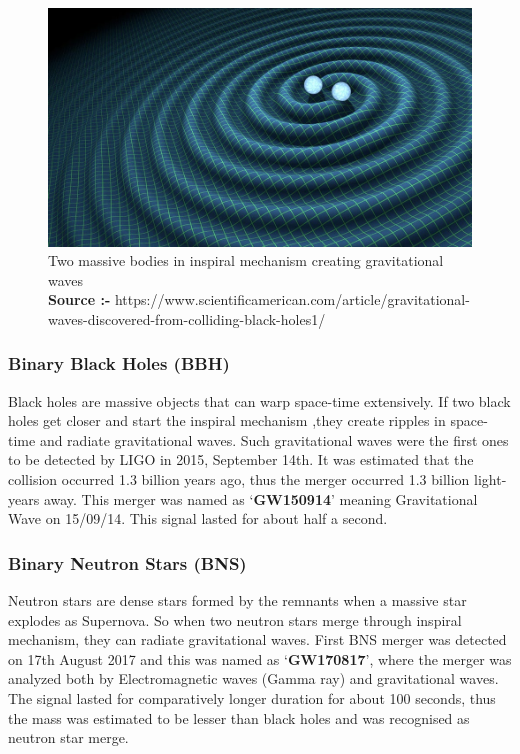 \begin{figure}[h]
    \centering
    \includegraphics[scale=0.45]{images.tex/binaries.jpeg}
    \caption{Two massive bodies in inspiral mechanism creating gravitational waves \\
    \textbf{Source :-} https://www.scientificamerican.com/article/gravitational-waves-discovered-from-colliding-black-holes1/}
\end{figure}

\pagebreak

\subsubsection{Binary Black Holes (BBH)}

Black holes are massive objects that can warp space-time extensively. If two black holes get closer and start the inspiral mechanism ,they create ripples in space-time and radiate gravitational waves. Such gravitational waves were the first ones to be detected by LIGO in 2015, September 14th. It was estimated that the collision occurred 1.3 billion years ago, thus the merger occurred 1.3 billion light-years away. This merger was named as `\textbf{GW150914}' meaning Gravitational Wave on 15/09/14. This signal lasted for about half a second.

\subsubsection{Binary Neutron Stars (BNS)}

Neutron stars are dense stars formed by the remnants when a massive star explodes as Supernova. So when two neutron stars merge through inspiral mechanism, they can radiate gravitational waves. First BNS merger was detected on 17th August 2017 and this was named as `\textbf{GW170817}', where the merger was analyzed both by Electromagnetic waves (Gamma ray) and gravitational waves. The signal lasted for comparatively longer duration for about 100 seconds, thus the mass was estimated to be lesser than black holes and was recognised as neutron star merge.



